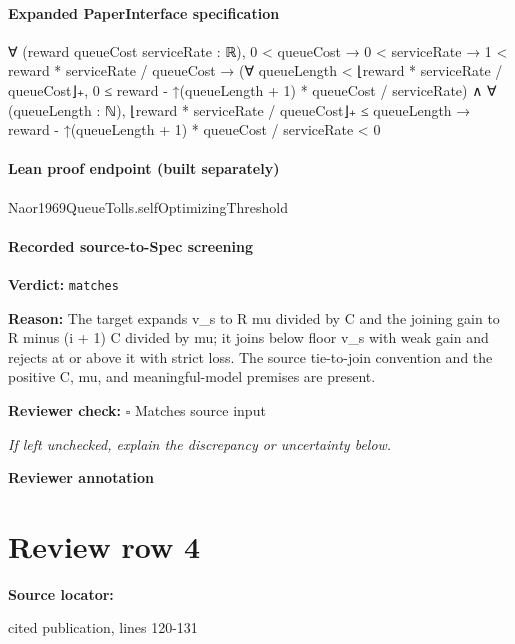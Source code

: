 \documentclass[10pt]{article}
\newcommand{\reviewerbox}{%
  \par\noindent\fbox{\parbox{0.96\linewidth}{\rule{0pt}{0.38in}}}\par
}
\newcommand{\reviewmatch}[1]{%
  \par\noindent\textbf{Reviewer check:} $\square$\; #1\par
  \noindent\emph{If left unchecked, explain the discrepancy or uncertainty below.}\par
}
\begin{document}
\paragraph{Expanded PaperInterface specification}
\begin{ReviewVerbatim}
∀ (reward queueCost serviceRate : ℝ),
  0 < queueCost →
    0 < serviceRate →
      1 < reward * serviceRate / queueCost →
        (∀ queueLength < ⌊reward * serviceRate / queueCost⌋₊,
            0 ≤ reward - ↑(queueLength + 1) * queueCost / serviceRate) ∧
          ∀ (queueLength : ℕ),
            ⌊reward * serviceRate / queueCost⌋₊ ≤ queueLength →
              reward - ↑(queueLength + 1) * queueCost / serviceRate < 0
\end{ReviewVerbatim}



\paragraph{Lean proof endpoint (built separately)}\begin{ReviewVerbatim}
Naor1969QueueTolls.selfOptimizingThreshold
\end{ReviewVerbatim}

\paragraph{Recorded source-to-Spec screening}
\textbf{Verdict:} \texttt{matches}
\\
{\raggedright
\textbf{Reason:} The target expands v\_\allowbreak{}s to R mu divided by C and the joining gain to R minus (i + 1) C divided by mu;\allowbreak{} it joins below floor v\_\allowbreak{}s with weak gain and rejects at or above it with strict loss.\allowbreak{} The source tie-\allowbreak{}to-\allowbreak{}join convention and the positive C, mu, and meaningful-\allowbreak{}model premises are present.\allowbreak{}
\par}
\reviewmatch{Matches source input}
\noindent\textbf{Reviewer annotation}\par
\reviewerbox
\clearpage
\hypertarget{source-claim-3146143f04683090}{}
\section*{Review row 4}
\textbf{Source locator:} {\footnotesize\raggedright cited publication, lines 120-\allowbreak{}131\par}
\end{document}
